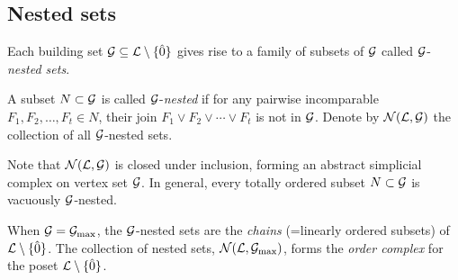 \subsection{Nested sets}
\label{nested-set-subsection}
Each building set $\mathcal{G} \subseteq \mathcal{L} \setminus \{\hat{0}\}$ gives rise to a family of subsets of $\mathcal{G}$
called $\mathcal{G}$-\emph{nested sets}.

\begin{defn}\label{def:nested-sets}
    A subset $N \subset \mathcal{G}$
    is called $\mathcal{G}$-\emph{nested} if 
    for any pairwise incomparable $F_1, F_2, \ldots, F_t \in N$, their join $F_1\vee F_2\vee \cdots \vee F_t$ is not in $\mathcal{G}$. 
    Denote by $\mathcal{N}(\mathcal{L},\mathcal{G})$ the collection
    of all $\mathcal{G}$-nested sets.
\end{defn}

Note that $\mathcal{N}(\mathcal{L},\mathcal{G})$ is closed under
inclusion, forming an abstract simplicial
complex on vertex set $\mathcal{G}$. In general, every totally ordered subset $N \subset \mathcal{G}$ is vacuously $\mathcal{G}$-nested. 

\begin{example}
When $\mathcal{G} = \mathcal{G}_{\max}$, the $\mathcal{G}$-nested sets are the {\it chains} (=linearly ordered subsets) of $\mathcal{L} \setminus \{\hat{0}\}$. The collection of nested sets, $\mathcal{N}(\mathcal{L},\mathcal{G}_{\max})$, forms the {\it order complex} for the poset $\mathcal{L} \setminus \{\hat{0}\}$.
\end{example}

